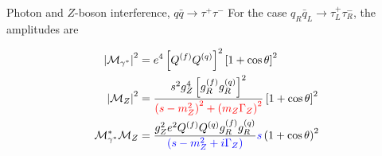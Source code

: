 \documentclass{../bredelebeamer}
\begin{document}
\begin{frame}{Photon and $Z$-boson interference, $q \bar q \longrightarrow \tau^+ \tau^- $}
    For the case $q_R \bar q_L \longrightarrow \tau_L^+ \tau_R^-$, the amplitudes are
    \begin{minipage}{0.65\textwidth}
        \begin{equation}
            \begin{aligned}
                \abs{\mathcal{M}_{\gamma^*}}^2          & = e^4\left[Q^{(f)} Q^{(q)}\right]^2\left[1+\cos \theta\right]^2                                                                      \\
                \abs{\mathcal{M}_{Z}}^2                 & = \frac{s^2 g_Z^4\left[g_R^{(f)} g_R^{(q)}\right]^2}{\textcolor{red}{\left(s-m_Z^2\right)^2+\left(m_Z \Gamma_Z\right)^2}}\left[1+\cos \theta\right]^2 \\
                \mathcal{M}_{\gamma^*}^*\mathcal{M}_{Z} & = \frac{g_Z^2 e^2 Q^{(f)} Q^{(q)} g_R^{(f)} g_R^{(q)}}{\textcolor{blue}{\left(s-m_Z^2+i \Gamma_Z\right)}} \textcolor{blue}{s}\left(1+\cos \theta\right)^2 \notag
            \end{aligned}
        \end{equation}
    \end{minipage}
    \hfill
    \begin{minipage}{0.33\textwidth}
    \end{minipage}
\end{frame}
\end{document}
